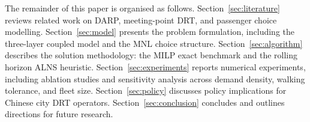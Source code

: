 The remainder of this paper is organised as follows.
Section~\ref{sec:literature} reviews related work on DARP, meeting-point DRT, and
passenger choice modelling.
Section~\ref{sec:model} presents the problem formulation, including the three-layer
coupled model and the MNL choice structure.
Section~\ref{sec:algorithm} describes the solution methodology: the MILP exact
benchmark and the rolling horizon ALNS heuristic.
Section~\ref{sec:experiments} reports numerical experiments, including ablation
studies and sensitivity analysis across demand density, walking tolerance, and fleet
size.
Section~\ref{sec:policy} discusses policy implications for Chinese city DRT operators.
Section~\ref{sec:conclusion} concludes and outlines directions for future research.
